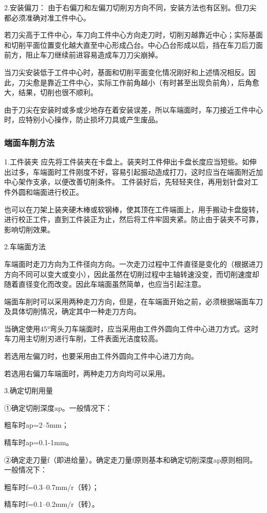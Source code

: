 \documentclass{ctexbook}
\begin{document}
2.安装偏刀：
由于右偏刀和左偏刀切削刃方向不同，安装方法也有区别。但刀尖都必须准确对准工件中心。

若刀尖高于工件中心，车刀向工件中心方向走刀时，切削刃越靠近中心；实际基面和切削平面位置变化越大直至中心形成凸台。中心凸台形成以后，挡在车刀后刀面前方，阻止车刀继续前进容易造成车刀刀尖崩掉。

当刀尖安装低于工件中心时，基面和切削平面变化情况刚好和上述情况相反。因此，刀尖愈是靠近工件中心，实际工作前角越小（有时甚至出现负前角），后角愈大，结果，切削也很不顺利。

由于刀尖在安装时或多或少地存在着安装误差，所以车端面时，车刀接近工件中心时，应特别小心操作，防止损坏刀具或产生废品。
\subsubsection{端面车削方法}
1.工件装夹 应先将工件装夹在卡盘上。装夹时工件伸出卡盘长度应当短些。如伸出过多，车端面时工件刚度不好，容易引起振动造成打刀，这时应当在端面附近加中心架作支承，以便改善切削条件。
工件装好后，先轻轻夹住，再用划针盘对工件外圆和端面进行校正。

也可以在刀架上装夹硬木棒或软钢棒，使其顶在工件端面上，用手搬动卡盘旋转，进行校正工件，直到工件装正为止，然后将工件牢固夹紧。防止由于装夹不可靠，影响切削效果。

2.车端面方法

车端面时走刀方向为工件径向方向。一次走刀过程中工件直径是变化的（根据进刀方向不同可以变大或变小），因此虽然在切削过程中主轴转速没变，而切削速度却随着直径变化而改变。因此车端面虽然简单，也应当引起注意。

端面车削时可以采用两种走刀方向，但是，在车端面开始之前，必须根据端面车刀及具体切削情况，确定其中一种走刀方向。

当确定使用45°弯头刀车端面时，应当采用由工件外圆向工件中心进刀方式。这时车刀用主切削刃进行车削，工件表面光洁度较高。

若选用左偏刀时，也要采用由工件外圆向工件中心进刀方向。

若选用右偏刀车端面时，两种走刀方向均可以采用。

3.确定切削用量

①确定切削深度ap。一般情况下：

粗车时ap=2--5mm；

精车时ap=0.1-1mm。

②确定走刀量f（即进给量）。确定走刀量f原则基本和确定切削深度ap原则相同。一般情况下：

粗车时f=0.3--0.7mm/r（转）；

精车时f=0.1--0.2mm/r（转）。
\end{document}
